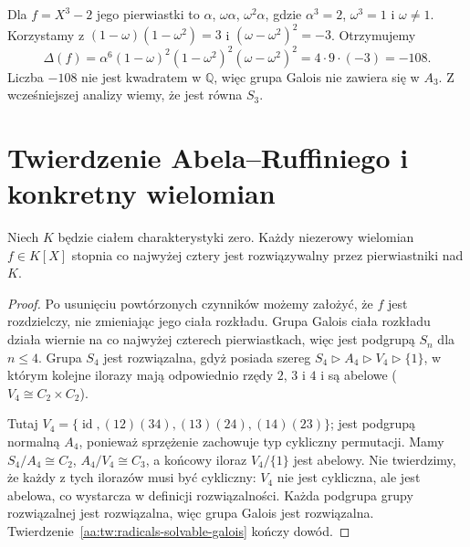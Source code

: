 \begin{przyklad}
\label{aa:prz:discriminant-cubic}
Dla $f=X^3-2$ jego pierwiastki to
$\alpha$, $\omega\alpha$, $\omega^2\alpha$,
gdzie $\alpha^3=2$, $\omega^3=1$ i $\omega\ne1$.
Korzystamy z $(1-\omega)(1-\omega^2)=3$
i $(\omega-\omega^2)^2=-3$. Otrzymujemy
\[
\Delta(f)=\alpha^6(1-\omega)^2(1-\omega^2)^2
(\omega-\omega^2)^2=4\cdot9\cdot(-3)=-108.
\]
Liczba $-108$ nie jest kwadratem w $\mathbb Q$,
więc grupa Galois nie zawiera się w $A_3$.
Z wcześniejszej analizy wiemy, że jest równa $S_3$.
\end{przyklad}

\section{Twierdzenie Abela--Ruffiniego i konkretny wielomian}
\begin{twierdzenie}
\label{aa:tw:radicals-degree-four}
Niech $K$ będzie ciałem charakterystyki zero.
Każdy niezerowy wielomian $f\in K[X]$ stopnia co najwyżej
cztery jest rozwiązywalny przez pierwiastniki nad $K$.
\end{twierdzenie}
\begin{proof}
Po usunięciu powtórzonych czynników możemy założyć,
że $f$ jest rozdzielczy, nie zmieniając jego ciała rozkładu.
Grupa Galois ciała rozkładu działa wiernie na co najwyżej
czterech pierwiastkach, więc jest podgrupą $S_n$ dla
$n\le4$. Grupa $S_4$ jest rozwiązalna, gdyż posiada szereg
$S_4\triangleright A_4\triangleright V_4\triangleright\{1\}$,
w którym kolejne ilorazy mają odpowiednio rzędy $2$, $3$ i $4$
i są abelowe ($V_4\cong C_2\times C_2$).

Tutaj $V_4=\{\operatorname{id},(12)(34),(13)(24),(14)(23)\}$;
jest podgrupą normalną $A_4$, ponieważ sprzężenie
zachowuje typ cykliczny permutacji. Mamy
$S_4/A_4\cong C_2$, $A_4/V_4\cong C_3$,
a końcowy iloraz $V_4/\{1\}$ jest abelowy.
Nie twierdzimy, że każdy z tych ilorazów musi być cykliczny:
$V_4$ nie jest cykliczna, ale jest abelowa, co wystarcza
w definicji rozwiązalności.
Każda podgrupa grupy rozwiązalnej jest rozwiązalna,
więc grupa Galois jest rozwiązalna.
Twierdzenie~\ref{aa:tw:radicals-solvable-galois} kończy dowód.
\end{proof}

